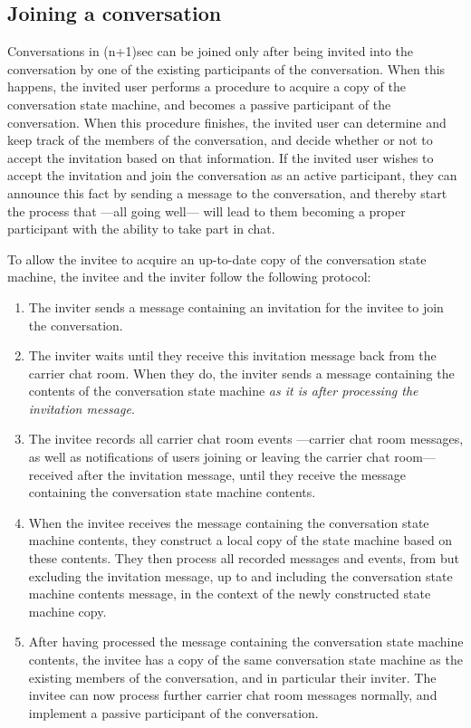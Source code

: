 \documentclass{article}
\begin{document}
\subsection{Joining a conversation}
\label{sec:conversation-state-machine/joining}

Conversations in (n+1)sec can be joined only after being invited into the conversation by one of the existing participants of the conversation.
When this happens, the invited user performs a procedure to acquire a copy of the conversation state machine, and becomes a passive participant of the conversation.
When this procedure finishes, the invited user can determine and keep track of the members of the conversation, and decide whether or not to accept the invitation based on that information.
If the invited user wishes to accept the invitation and join the conversation as an active participant, they can announce this fact by sending a message to the conversation, and thereby start the process that ---all going well--- will lead to them becoming a proper participant with the ability to take part in chat.

To allow the invitee to acquire an up-to-date copy of the conversation state machine, the invitee and the inviter follow the following protocol:
\begin{enumerate}
\item The inviter sends a message containing an invitation for the invitee to join the conversation.
\item The inviter waits until they receive this invitation message back from the carrier chat room. When they do, the inviter sends a message containing the contents of the conversation state machine \emph{as it is after processing the invitation message}.
\item The invitee records all carrier chat room events ---carrier chat room messages, as well as notifications of users joining or leaving the carrier chat room--- received after the invitation message, until they receive the message containing the conversation state machine contents.
\item When the invitee receives the message containing the conversation state machine contents, they construct a local copy of the state machine based on these contents. They then process all recorded messages and events, from but excluding the invitation message, up to and including the conversation state machine contents message, in the context of the newly constructed state machine copy.
\item After having processed the message containing the conversation state machine contents, the invitee has a copy of the same conversation state machine as the existing members of the conversation, and in particular their inviter. The invitee can now process further carrier chat room messages normally, and implement a passive participant of the conversation.
\end{enumerate}
\end{document}
